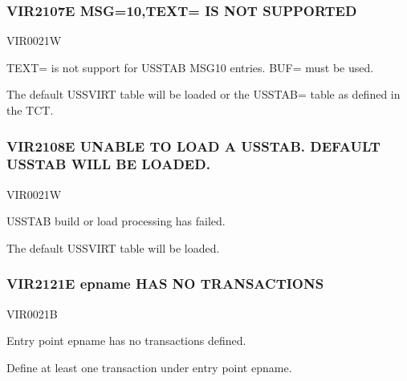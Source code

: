\documentclass[letterpaper,10pt,english]{sphinxmanual}
\begin{document}
\subsubsection{VIR2107E MSG=10,TEXT= IS NOT SUPPORTED}
\label{\detokenize{messages:vir2107e-msg-10-text-is-not-supported}}\begin{description}
\sphinxAtStartPar
VIR0021W

\sphinxAtStartPar
TEXT= is not support for USSTAB MSG10 entries. BUF= must be used.

\sphinxAtStartPar
The default USSVIRT table will be loaded or the USSTAB= table as defined in the TCT.

\end{description}


\subsubsection{VIR2108E UNABLE TO LOAD A USSTAB. DEFAULT USSTAB WILL BE LOADED.}
\label{\detokenize{messages:vir2108e-unable-to-load-a-usstab-default-usstab-will-be-loaded}}\begin{description}
\sphinxAtStartPar
VIR0021W

\sphinxAtStartPar
USSTAB build or load processing has failed.

\sphinxAtStartPar
The default USSVIRT table will be loaded.

\end{description}


\subsubsection{VIR2121E epname HAS NO TRANSACTIONS}
\label{\detokenize{messages:vir2121e-epname-has-no-transactions}}\begin{description}
\sphinxAtStartPar
VIR0021B

\sphinxAtStartPar
Entry point epname has no transactions defined.

\sphinxAtStartPar
Define at least one transaction under entry point epname.

\end{description}
\end{document}
